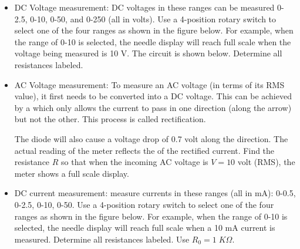 \begin{enumerate}
  \begin{itemize}
    \item DC Voltage measurement: DC voltages in these ranges can be measured
      0-2.5, 0-10, 0-50, and 0-250 (all in volts). Use a 4-position rotary switch
      to select one of the four ranges as shown in the figure below. For example, 
      when the range of 0-10 is selected, the needle display will reach full scale 
      when the voltage being measured is 10 V. The circuit is shown below. Determine 
      all resistances labeled.


    \item AC Voltage measurement: To measure an AC voltage (in terms of its
      RMS value), it first needs to be converted into a DC voltage. This can 
      be achieved by a 
      which only allows the current to pass in one
      direction (along the arrow) but not the other. This process is called
      rectification. 


      The diode will also cause a voltage drop of 0.7 volt 
      along the direction. The actual reading of the meter reflects the 
      of the rectified current. Find the resistance $R$ so 
      that when the incoming AC voltage is $V=10$ volt (RMS), the meter shows 
      a full scale display.



    \item DC current measurement: measure currents in these ranges (all in mA):
      0-0.5, 0-2.5, 0-10, 0-50. Use a 4-position rotary switch to select one 
      of the four ranges as shown in the figure below. For example, when the 
      range of 0-10 is selected, the needle display will reach full scale when 
      a 10 mA current is measured. Determine all resistances labeled. Use
      $R_0=1\;K\Omega$.


\end{itemize}
\end{enumerate}
